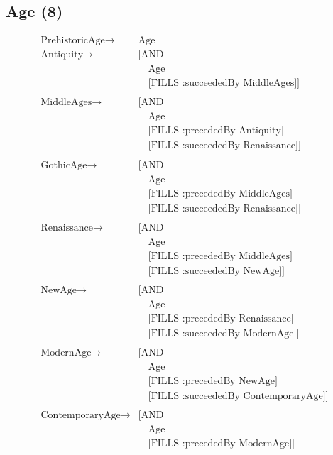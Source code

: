 \subsection{Age (8)}
    \begin{align*}
      \text{PrehistoricAge} \to& \text{Age}\\
      \text{Antiquity} \to& \text{[AND}\\
      &\quad\text{Age}\\
      &\quad\text{[FILLS :succeededBy MiddleAges]]}\\\\
      \text{MiddleAges} \to& \text{[AND}\\
      &\quad\text{Age}\\
      &\quad\text{[FILLS :precededBy Antiquity]}\\
      &\quad\text{[FILLS :succeededBy Renaissance]]}\\\\  
      \text{GothicAge} \to& \text{[AND}\\
      &\quad\text{Age}\\
      &\quad\text{[FILLS :precededBy MiddleAges]}\\
      &\quad\text{[FILLS :succeededBy Renaissance]]}\\\\
      \text{Renaissance} \to& \text{[AND}\\
      &\quad\text{Age}\\
      &\quad\text{[FILLS :precededBy MiddleAges]}\\
      &\quad\text{[FILLS :succeededBy NewAge]]}\\\\
      \text{NewAge} \to& \text{[AND}\\
      &\quad\text{Age}\\
      &\quad\text{[FILLS :precededBy Renaissance]}\\
      &\quad\text{[FILLS :succeededBy ModernAge]]}\\\\
      \text{ModernAge} \to& \text{[AND}\\
      &\quad\text{Age}\\
      &\quad\text{[FILLS :precededBy NewAge]}\\
      &\quad\text{[FILLS :succeededBy ContemporaryAge]]}\\\\
      \text{ContemporaryAge} \to& \text{[AND}\\
      &\quad\text{Age}\\
      &\quad\text{[FILLS :precededBy ModernAge]]}
    \end{align*}
    
